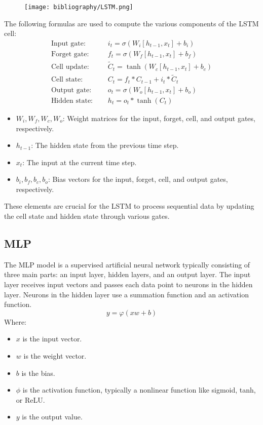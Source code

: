 \documentclass{ieeeojies}
\begin{document}
\begin{figure}[H]
    \centering
    \begin{minipage}{0.45\textwidth}
    \centering
    \texttt{[image: bibliography/LSTM.png]}    
    \label{fig:1}
    \end{minipage}
\end{figure}
The following formulas are used to compute the various components of the LSTM cell: \cite{b13}
\begin{align*}
\text{Input gate: } & \quad i_t = \sigma(W_i [h_{t-1}, x_t] + b_i) \\
\text{Forget gate: } & \quad f_t = \sigma(W_f [h_{t-1}, x_t] + b_f) \\
\text{Cell update: } & \quad \tilde{C}_t = \tanh(W_c [h_{t-1}, x_t] + b_c) \\
\text{Cell state: } & \quad C_t = f_t * C_{t-1} + i_t * \tilde{C}_t \\
\text{Output gate: } & \quad o_t = \sigma(W_o [h_{t-1}, x_t] + b_o) \\
\text{Hidden state: } & \quad h_t = o_t * \tanh(C_t)
\end{align*}

\begin{itemize}
    \item $W_i, W_f, W_c, W_o$: Weight matrices for the input, forget, cell, and output gates, respectively.
    \item $h_{t-1}$: The hidden state from the previous time step.
    \item $x_t$: The input at the current time step.
    \item $b_i, b_f, b_c, b_o$: Bias vectors for the input, forget, cell, and output gates, respectively.
\end{itemize}

These elements are crucial for the LSTM to process sequential data by updating the cell state and hidden state through various gates.

\subsection{MLP} 
The MLP model is a supervised artificial neural network typically consisting of three main parts: an input layer, hidden layers, and an output layer. The input layer receives input vectors and passes each data point to neurons in the hidden layer. Neurons in the hidden layer use a summation function and an activation function. \cite{b14}
\[
y = \varphi(xw + b)
\]
Where:
\begin{itemize}
    \item $x$ is the input vector.
    \item $w$ is the weight vector.
    \item $b$ is the bias.
    \item $\phi$ is the activation function, typically a nonlinear function like sigmoid, tanh, or ReLU.
    \item $y$ is the output value.
\end{itemize}
\end{document}
